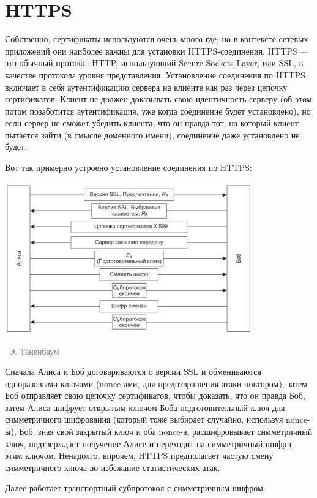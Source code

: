 \documentclass[a5paper]{article}
\newcommand{\attribution}[1] {
\vspace{-5mm}\begin{flushright}\begin{scriptsize}\textcolor{gray}{\textcopyright\, #1}\end{scriptsize}\end{flushright}
}
\begin{document}
\section{HTTPS}

Собственно, сертификаты используются очень много где, но в контексте сетевых приложений они наиболее важны для установки HTTPS-соединения. HTTPS --- это обычный протокол HTTP, использующий Secure Sockets Layer, или SSL, в качестве протокола уровня представления. Установление соединения по HTTPS включает в себя аутентификацию сервера на клиенте как раз через цепочку сертификатов. Клиент не должен доказывать свою идентичность серверу (об этом потом позаботится аутентификация, уже когда соединение будет установлено), но если сервер не сможет убедить клиента, что он правда тот, на который клиент пытается зайти (в смысле доменного имени), соединение даже установлено не будет.

Вот так примерно устроено установление соединения по HTTPS:

\begin{center}
    \includegraphics[width=0.8\textwidth]{ssl.png}
    \attribution{Э. Таненбаум}
\end{center}

Сначала Алиса и Боб договариваются о версии SSL и обмениваются одноразовыми ключами (nonce-ами, для предотвращения атаки повтором), затем Боб отправляет свою цепочку сертификатов, чтобы доказать, что он правда Боб, затем Алиса шифрует открытым ключом Боба подготовительный ключ для симметричного шифрования (который тоже выбирает случайно, используя nonce-ы), Боб, зная свой закрытый ключ и оба nonce-а, расшифровывает симметричный ключ, подтверждает получение Алисе и переходит на симметричный шифр с этим ключом. Ненадолго, впрочем, HTTPS предполагает частую смену симметричного ключа во избежание статистических атак.

Далее работает транспортный субпротокол с симметричным шифром: 
\end{document}

